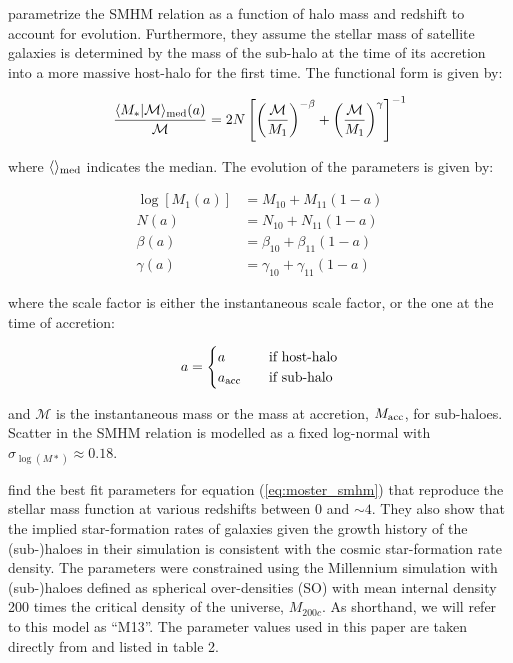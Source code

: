 \documentclass[a4paper,fleqn,usenatbib]{mnras}
\begin{document}
\cite{Moster:2013ab} parametrize the SMHM relation as a function of halo mass and redshift to account for evolution.  Furthermore, they assume the stellar mass of satellite galaxies is determined by the mass of the sub-halo at the time of its accretion into a more massive host-halo for the first time.  The functional form is given by:
%
\begin{linenomath}
\begin{equation}
\label{eq:moster_smhm}
\frac{\langle M_{*} | \mathcal{M}\rangle_{\rm med}(a)}{\mathcal{M}} = 2N\left[ \left(\frac{\mathcal{M}}{{M}_1} \right)^{-\beta} + \left( \frac{\mathcal{M}}{{M}_1} \right)^{\gamma} \right]^{-1}
\end{equation}
\end{linenomath}
%
where $\langle\rangle_{\rm med}$ indicates the median.  The evolution of the parameters is given by:
%
\begin{linenomath}
\begin{align}
\label{eq:smhm_params}
\log[{M}_1(a)]& = {M}_{10} + {M}_{11}(1-a) \\
N(a) &= N_{10} + N_{11}(1-a) \\
\beta(a) &= \beta_{10} + \beta_{11}(1-a) \\ 
\gamma(a) &=  \gamma_{10} + \gamma_{11}(1-a)
\end{align}
\end{linenomath}
%
where the scale factor is either the instantaneous scale factor, or the one at the time of accretion:
%
\begin{linenomath}
\begin{equation}
a = 
\begin{cases}
    a      & \quad \text{if host-halo}\\
    a_{\rm acc}  & \quad \text{if sub-halo} \\
  \end{cases}
\end{equation}
\end{linenomath}
%
and $\mathcal{M}$ is the instantaneous mass or the mass at accretion, $M_{\rm acc}$, for sub-haloes.  Scatter in the SMHM relation is modelled as a fixed log-normal with $\sigma_{\log(M*)} \approx 0.18$.

\citet{Moster:2013ab} find the best fit parameters for equation (\ref{eq:moster_smhm}) that reproduce the stellar mass function at various redshifts between 0 and $\sim 4$.  They also show that the implied star-formation rates of galaxies given the growth history of the (sub-)haloes in their simulation is consistent with the cosmic star-formation rate density.  The parameters were constrained using the Millennium simulation with (sub-)haloes defined as spherical over-densities (SO) with mean internal density 200 times the critical density of the universe, $M_{200c}$.   As shorthand, we will refer to this model as ``M13''.  The parameter values used in this paper are taken directly from \citet{Moster:2013ab} and listed in table 2.
      
\end{document}
